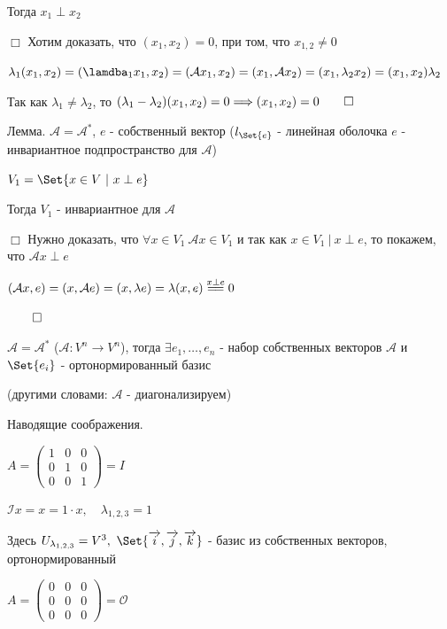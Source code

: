 \documentclass[12pt]{article}
\begin{document}
    Тогда $x_1 \perp x_2$

    $\Box$ Хотим доказать, что $(x_1, x_2) = 0$, при том, что $x_{1,2} \neq 0$

    $\lambda_1 (x_1, x_2) = (\lamdba_1 x_1, x_2) = (\mathcal{A} x_1, x_2) = (x_1, \mathcal{A} x_2) = (x_1, \lambda_2 x_2) = (x_1, x_2) \lambda_2$

    Так как $\lambda_1 \neq \lambda_2$, то $(\lambda_1 - \lambda_2) (x_1, x_2) = 0 \Longrightarrow (x_1, x_2) = 0 \qed$

    \hypertarget{lemmaabouteigenvectors}{}

    \Th Лемма. $\mathcal{A} = \mathcal{A}^*$, $e$ - собственный вектор ($l_{\Set{e}}$ - линейная оболочка $e$ - инвариантное подпространство для $\mathcal{A}$)

    $V_1 = \Set{x \in V \ | \ x \perp e}$

    Тогда $V_1$ - инвариантное для $\mathcal{A}$

    $\Box$ Нужно доказать, что $\forall x \in V_1 \ \mathcal{A}x \in V_1$ и так как $x \in V_1 \ | \ x \perp e$, то
    покажем, что $\mathcal{A}x \perp e$

    $(\mathcal{A}x, e) = (x, \mathcal{A}e) = (x, \lambda e) = \lambda (x, e) \stackrel{x \perp e}{=\joinrel=} 0$

    $\qed$

    \hypertarget{theoremabouteigenvectorsinselfconjugateoperator}{}

    \Th $\mathcal{A} = \mathcal{A}^*$ ($\mathcal{A} : V^n \to V^n$),
    тогда $\exists e_1, \dots, e_n$ - набор собственных векторов $\mathcal{A}$ и $\Set{e_i}$ - ортонормированный базис

    (другими словами: $\mathcal{A}$ - диагонализируем)

    Наводящие соображения.

     $A = \begin{pmatrix}1 & 0 & 0 \\ 0 & 1 & 0 \\ 0 & 0 & 1\end{pmatrix} = I$

    $\mathcal{I}x = x = 1 \cdot x, \quad \lambda_{1,2,3} = 1$

    Здесь $U_{\lambda_{1,2,3}} = V^3, \ \Set{\overrightarrow{i}, \overrightarrow{j}, \overrightarrow{k}}$ - базис из собственных векторов, ортонормированный

     $A = \begin{pmatrix}0 & 0 & 0 \\ 0 & 0 & 0 \\ 0 & 0 & 0\end{pmatrix} = \mathcal{O}$
\end{document}
